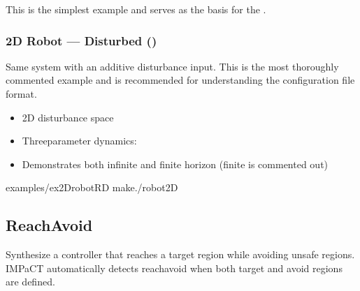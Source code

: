 \documentclass[a4paper,10pt,english]{sphinxmanual}
\begin{document}
\sphinxAtStartPar
This is the simplest example and serves as the basis for the {\hyperref[\detokenize{getting-started/quickstart::doc}]{}}.


\subsubsection{2D Robot — Disturbed ()}
\label{\detokenize{examples/reachability:d-robot-disturbed-ex-2drobot-r-d}}
\sphinxAtStartPar
Same system with an additive disturbance input. This is the most thoroughly
commented example and is recommended for understanding the configuration file format.

\sphinxAtStartPar
{}
\begin{itemize}
\item {} 
\sphinxAtStartPar
2D disturbance space

\item {} 
\sphinxAtStartPar
Three\sphinxhyphen{}parameter dynamics: 

\item {} 
\sphinxAtStartPar
Demonstrates both infinite and finite horizon (finite is commented out)

\end{itemize}

\sphinxAtStartPar
{}

\begin{sphinxVerbatim}[commandchars=\\\{\}]
examples/ex\PYGZus{}2Drobot\PYGZhy{}R\PYGZhy{}D
make./robot2D
\end{sphinxVerbatim}

\sphinxstepscope


\subsection{Reach\sphinxhyphen{}Avoid}
\label{\detokenize{examples/reach-avoid:reach-avoid}}\label{\detokenize{examples/reach-avoid::doc}}
\sphinxAtStartPar
Synthesize a controller that reaches a target region while avoiding unsafe regions.
IMPaCT automatically detects reach\sphinxhyphen{}avoid when both target and avoid regions are defined.
\end{document}
